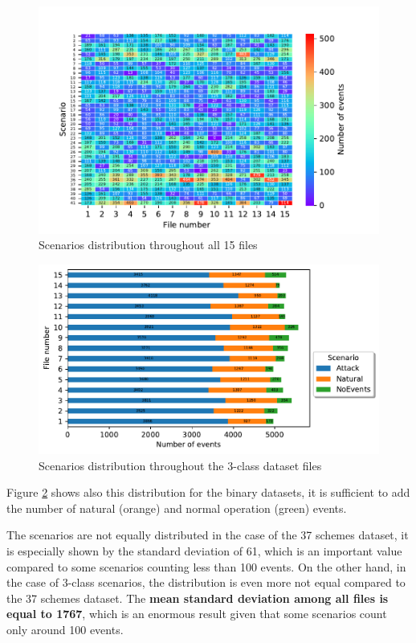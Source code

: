 \begin{figure}[H]
    \centering
    \includegraphics[]{images/distr_allscen.pdf}
    \caption{Scenarios distribution throughout all 15 files} \label{fig:scen_distro_37}
\end{figure}

\begin{figure}[H]
    \centering
    \includegraphics[]{images/distr_3classes.pdf}
    \caption{Scenarios distribution throughout the 3-class dataset files}
    \label{fig:scen_distro_file}
\end{figure}

Figure \ref{fig:scen_distro_file} shows also this distribution for the binary datasets, it is sufficient to add the number of natural (orange) and normal operation (green) events.

The scenarios are not equally distributed in the case of the 37 schemes dataset, it is especially shown by the standard deviation of 61, which is an important value compared to some scenarios counting less than 100 events. On the other hand, in the case of 3-class scenarios, the distribution is even more not equal compared to the 37 schemes dataset. The \textbf{mean standard deviation among all files is equal to 1767}, which is an enormous result given that some scenarios count only around 100 events.

